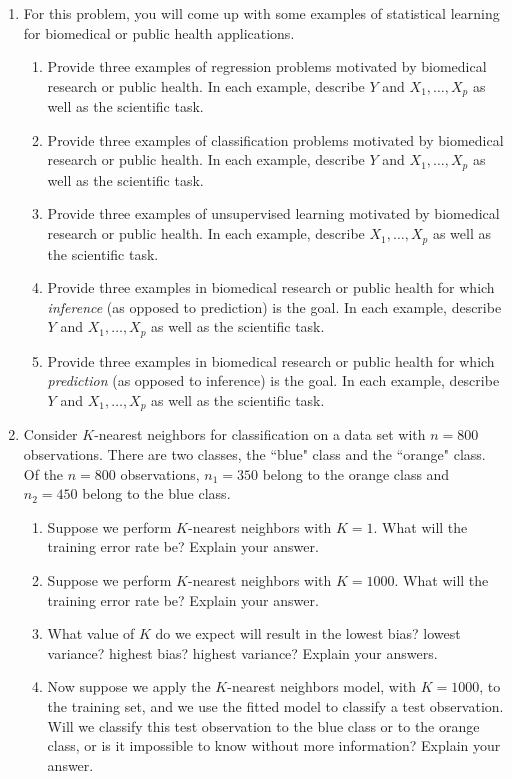 \documentclass[12pt]{article}
\begin{document}
\begin{enumerate}


\item  For this problem, you will come up with some examples of statistical learning  for biomedical  or public health applications. \begin{enumerate}
\item Provide three examples of regression problems motivated by biomedical research or public health.   In each example, describe $Y$ and $X_1,\ldots,X_p$ as well as the scientific task.
\item Provide three examples of classification problems motivated by biomedical research or public health.   In each example, describe $Y$ and $X_1,\ldots,X_p$ as well as the scientific task.
\item Provide three examples of unsupervised learning motivated by biomedical research or public health.   In each example, describe  $X_1,\ldots,X_p$ as well as the scientific task.
\item Provide three examples in biomedical research or public health for which \emph{inference}  (as opposed to prediction) is the goal. In each example, describe $Y$ and  $X_1,\ldots,X_p$ as well as the scientific task.
\item Provide three examples in biomedical research or public health for which \emph{prediction}  (as opposed to inference) is the goal. In each example, describe $Y$ and  $X_1,\ldots,X_p$ as well as the scientific task.
\end{enumerate}

\item Consider $K$-nearest neighbors for classification on a data set with $n=800$ observations. There are two classes, the ``blue" class and the ``orange" class. 
 Of the $n=800$ observations, $n_1=350$ belong to the orange class and $n_2=450$ belong to the blue class. 
 \begin{enumerate}
 \item Suppose we perform $K$-nearest neighbors with $K=1$. What will the training error rate be? Explain your answer. 
  \item Suppose we perform $K$-nearest neighbors with $K=1000$. What will the training error rate be? Explain your answer. 
  \item What value of $K$ do we expect will result in the lowest bias? lowest variance? highest bias? highest variance? Explain your answers. 
  \item Now suppose we apply the $K$-nearest neighbors model, with $K=1000$, to the training set, and we use the fitted model to classify a test observation. Will we classify this test observation to the blue class or to the orange class, or is it impossible to know without more information? Explain your answer. 
 \end{enumerate}
 

\end{enumerate}
\end{document}
